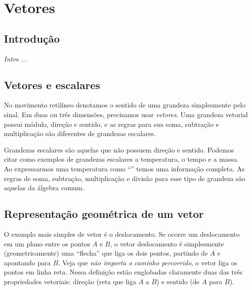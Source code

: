 \chapter{Vetores}
\label{Chap:Vetores}


\section{Introdução}

{\it
Intro ...
}

\section{Vetores e escalares}

No movimento retilíneo denotamos o sentido de uma grandeza simplesmente pelo sinal. Em duas ou três dimensões, precisamos usar \emph{vetores}. Uma grandeza vetorial possui módulo, direção e sentido, e as regras para sua soma, subtração e multiplicação são diferentes de grandezas escalares.

Grandezas escalares são aquelas que não possuem direção e sentido. Podemos citar como exemplos de grandezas escalares a temperatura, o tempo e a massa. Ao expressarmos uma temperatura como ``'' temos uma informação completa. As regras de soma, subtração, multiplicação e divisão para esse tipo de grandeza são aquelas da álgebra comum.

\section{Representação geométrica de um vetor}

O exemplo mais simples de vetor é o deslocamento. Se ocorre um deslocamento em um plano entre os pontos $A$ e $B$, o vetor deslocamento é simplesmente (geometricamente) uma ``flecha'' que liga os dois pontos, partindo de $A$ e apontando para $B$. Veja que \emph{não importa o caminho percorrido}, o vetor liga os pontos em linha reta. Nessa definição estão englobadas claramente duas das três propriedades vetoriais: direção (reta que liga $A$ a $B$) e sentido (de $A$ para $B$). 

